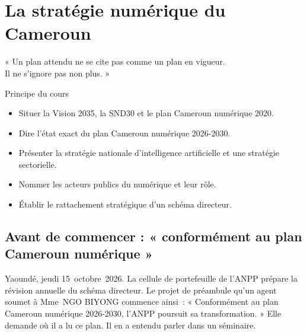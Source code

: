 
\chapter{La stratégie numérique du Cameroun}
\label{chap:cameroun}

\epigraph{%
    « Un plan attendu ne se cite pas comme un plan en vigueur.\\
    Il ne s'ignore pas non plus. »%
}{Principe du cours}


\begin{boxobjectifs}
\begin{itemize}
    \item Situer la Vision 2035, la SND30 et le plan Cameroun numérique 2020.
    \item Dire l'état exact du plan Cameroun numérique 2026-2030.
    \item Présenter la stratégie nationale d'intelligence artificielle et une stratégie sectorielle.
    \item Nommer les acteurs publics du numérique et leur rôle.
    \item Établir le rattachement stratégique d'un schéma directeur.
\end{itemize}
\end{boxobjectifs}

\bigskip

\section*{Avant de commencer : « conformément au plan Cameroun numérique »}

Yaoundé, jeudi 15~octobre~2026. La cellule de portefeuille de l'ANPP prépare la révision annuelle du schéma
directeur. Le projet de préambule qu'un agent soumet à Mme~NGO BIYONG commence ainsi~: « Conformément au plan
Cameroun numérique 2026-2030, l'ANPP poursuit sa transformation. » Elle demande où il a lu ce plan. Il en a
entendu parler dans un séminaire.

